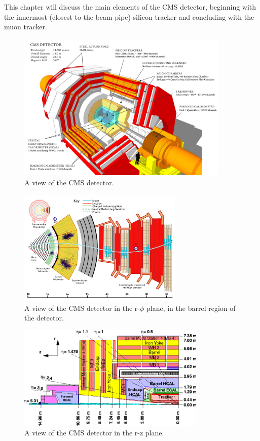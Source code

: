 This chapter will discuss the main elements of the CMS detector, beginning with the innermost (closest to the beam pipe) silicon tracker and concluding with the muon tracker. 

\begin{figure}[hb!]
\centering
\includegraphics[width=0.9\textwidth]{figs/howcmsworks.png}
\caption{A view of the CMS detector.}
\label{fig:howcmsworks}
\end{figure}

\begin{figure}[hb!]
\centering
\includegraphics[width=0.7\textwidth]{figs/CMS-PRF-14-001_Figure_001.pdf}
\caption{A view of the CMS detector in the r-$\phi$ plane, in the barrel region of the detector.}
\label{fig:schematicview}
\end{figure}

\begin{figure}[hb!]
\centering
\includegraphics[width=0.8\textwidth]{figs/img41.pdf}
\caption{A view of the CMS detector in the r-z plane.}
\label{fig:detectoreta}
\end{figure}

